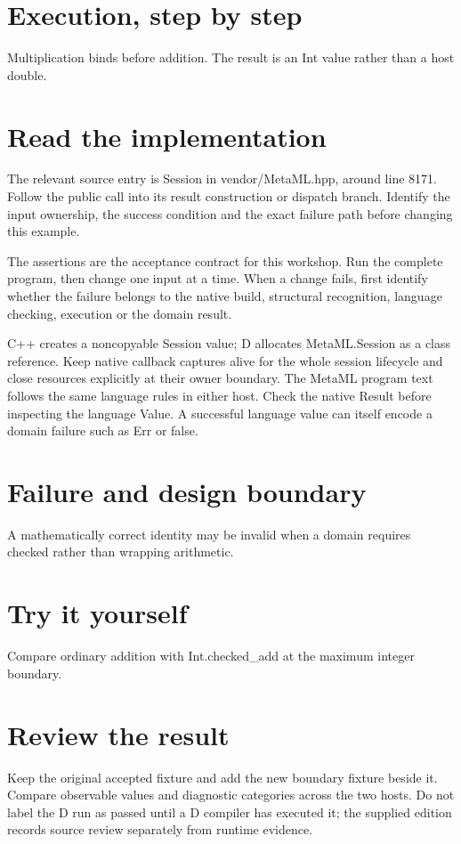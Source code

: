 
\section*{Execution, step by step}
Multiplication binds before addition. The result is an Int value rather than a host double.

\section*{Read the implementation}
The relevant source entry is Session in vendor/MetaML.hpp, around line 8171. Follow the public call into its result construction or dispatch branch. Identify the input ownership, the success condition and the exact failure path before changing this example.

The assertions are the acceptance contract for this workshop. Run the complete program, then change one input at a time. When a change fails, first identify whether the failure belongs to the native build, structural recognition, language checking, execution or the domain result.

\clearpage
{}
C++ creates a noncopyable Session value; D allocates MetaML.Session as a class reference. Keep native callback captures alive for the whole session lifecycle and close resources explicitly at their owner boundary. The MetaML program text follows the same language rules in either host. Check the native Result before inspecting the language Value. A successful language value can itself encode a domain failure such as Err or false.


\section*{Failure and design boundary}
A mathematically correct identity may be invalid when a domain requires checked rather than wrapping arithmetic.

\section*{Try it yourself}
Compare ordinary addition with Int.checked\_add at the maximum integer boundary.

\section*{Review the result}
Keep the original accepted fixture and add the new boundary fixture beside it. Compare observable values and diagnostic categories across the two hosts. Do not label the D run as passed until a D compiler has executed it; the supplied edition records source review separately from runtime evidence.

